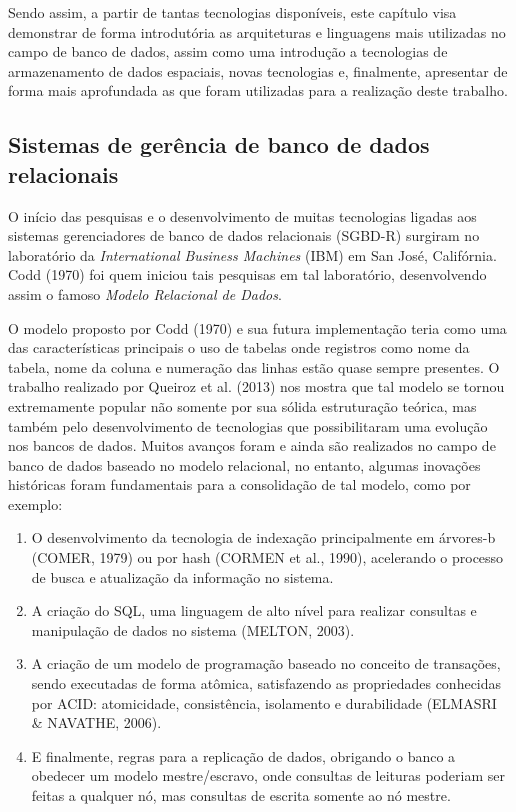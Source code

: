 		Sendo assim, a partir de tantas tecnologias disponíveis, este capítulo visa demonstrar de forma introdutória as arquiteturas e linguagens mais utilizadas no campo de banco de dados, assim como uma introdução a tecnologias de armazenamento de dados espaciais, novas tecnologias e, finalmente, apresentar de forma mais aprofundada as que foram utilizadas para a realização deste trabalho.
		
		\subsection{Sistemas de gerência de banco de dados relacionais}
		
		O início das pesquisas e o desenvolvimento de muitas tecnologias ligadas aos sistemas gerenciadores de banco de dados relacionais (SGBD-R) surgiram no laboratório da \textit{International Business Machines} (IBM) em San José, Califórnia. Codd (1970) \cite{CODD} foi quem iniciou tais pesquisas em tal laboratório, desenvolvendo assim o famoso \textit{Modelo Relacional de Dados}.
		
		O modelo proposto por Codd (1970)\cite{CODD} e sua futura implementação teria como uma das características principais o uso de tabelas onde registros como nome da tabela, nome da coluna e numeração das linhas estão quase sempre presentes. O trabalho realizado por Queiroz et al. (2013)\cite{QUEIROZ_etal13} nos mostra que tal modelo se tornou extremamente popular não somente por sua sólida estruturação teórica, mas também pelo desenvolvimento de tecnologias que possibilitaram uma evolução nos bancos de dados. Muitos avanços foram e ainda são realizados no campo de banco de dados baseado no modelo relacional, no entanto, algumas inovações históricas foram fundamentais para a consolidação de tal modelo, como por exemplo:
		
		\begin{enumerate}
			\item O desenvolvimento da tecnologia de indexação principalmente em árvores-b (COMER, 1979) ou por hash (CORMEN et al.,  1990)\cite{CORMEN_etal90}, acelerando o processo de busca e atualização da informação no sistema.
			
			\item A criação do SQL, uma linguagem de alto nível para realizar consultas e manipulação de dados no sistema (MELTON, 2003)\cite{MELTON}.
			
			\item A criação de um modelo de programação baseado no conceito de transações, sendo executadas de forma atômica, satisfazendo as propriedades conhecidas por ACID: atomicidade, consistência, isolamento e durabilidade (ELMASRI \& NAVATHE, 2006)\cite{ELMASRI_NAVATHE}.
			
			\item E finalmente, regras para a replicação de dados, obrigando o banco a obedecer um modelo mestre/escravo, onde consultas de leituras poderiam ser feitas a qualquer nó, mas consultas de escrita somente ao nó mestre.	
		\end{enumerate}
	

